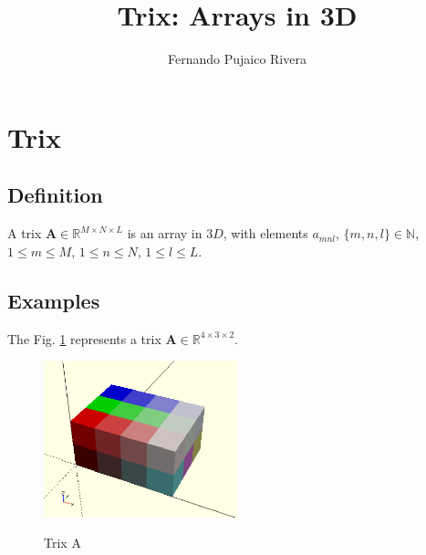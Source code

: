 \documentclass[11pt]{article}
\title{\textbf{Trix: Arrays in 3D}}
\author{Fernando Pujaico Rivera}
\date{}
\begin{document}
\maketitle

\section{Trix}
\subsection{Definition}

A trix $\mathbf{A}\in \mathbb{R}^{M\times N\times L}$ is an array in $3D$, with elements $a_{mnl}$, 
$\{m,n,l\}\in\mathbb{N}$, $1 \leq m \leq M$, $1 \leq n \leq N$, $1 \leq l \leq L$.
\subsection{Examples}
 
The Fig. \ref{fig:trix1} represents a trix $\mathbf{A}\in \mathbb{R}^{4\times 3\times 2}$.
\begin{figure}[h]
  \caption{Trix A}
  \centering
    \includegraphics[width=0.5\textwidth]{array3d}
    \label{fig:trix1}
\end{figure}
\end{document}
